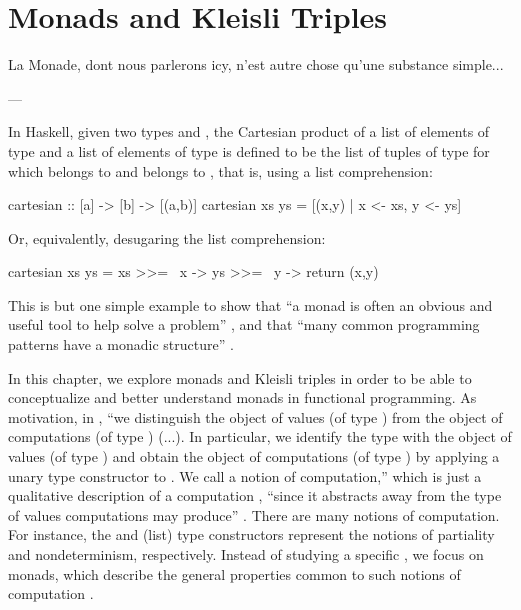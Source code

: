 \chapter{Monads and Kleisli Triples}
\label{chap:monads}

\epigraph{
  La Monade, dont nous parlerons icy, n'est autre chose qu'une
  substance simple...
}{---\textcite[1]{leibniz-1714}}

In Haskell, given two types  and , the
Cartesian product of a list  of elements of type
 and a list  of elements of type
 is defined to be the list of tuples
 of type  for which
 belongs to  and 
belongs to , that is, using a list comprehension:
\begin{codehaskell}
cartesian :: [a] -> [b] -> [(a,b)]
cartesian xs ys = [(x,y) | x <- xs, y <- ys]
\end{codehaskell}
Or, equivalently, desugaring the list comprehension:
\begin{codehaskell}
cartesian xs ys = xs >>= \ x -> ys >>= \ y -> return (x,y)
\end{codehaskell}
This is but one simple example to show that ``a monad is often an
obvious and useful tool to help solve a problem''
\parencite[325]{osullivan-et-al-2008}, and that ``many common
programming patterns have a monadic structure''
\parencite[328]{osullivan-et-al-2008}.

In this chapter, we explore monads and Kleisli triples in order to be
able to conceptualize and better understand monads in functional
programming. As motivation, in \hask, ``we distinguish the object
 of values (of type ) from the object
 of computations (of type ) (...). In
particular, we identify the type  with the object of
values (of type ) and obtain the object of computations
(of type ) by applying a unary type constructor
 to . We call  a notion
of computation,'' which is just a qualitative description of a
computation \parencite[17]{moggi-1989}, ``since it abstracts away from
the type of values computations may produce''
\parencite[57--58]{moggi-1991}. There are many notions of computation.
For instance, the  and \texthaskell{[]} (list) type
constructors represent the notions of partiality and nondeterminism,
respectively. Instead of studying a specific , we focus
on monads, which describe the general properties common to such
notions of computation \parencite[58]{moggi-1991}.

